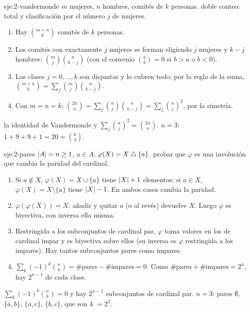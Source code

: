 \begin{solucion}{eje:2-vandermonde}
\datos $m$ mujeres, $n$ hombres, comités de $k$ personas.
\planteamiento doble conteo: total y clasificación por el número $j$ de mujeres.
\pasos
\begin{enumerate}[label=\arabic*.]
  \item Hay $\binom{m+n}{k}$ comités de $k$ personas.
  \item Los comités con exactamente $j$ mujeres se forman eligiendo $j$ mujeres y $k-j$ hombres: $\binom mj\binom n{k-j}$ (con el convenio $\binom ab=0$ si $b>a$ o $b<0$).
  \item Las clases $j=0,\dots,k$ son disjuntas y lo cubren todo; por la regla de la suma, $\binom{m+n}k=\sum_j\binom mj\binom n{k-j}$.
  \item Con $m=n=k$: $\binom{2n}{n}=\sum_j\binom nj\binom n{n-j}=\sum_j\binom nj^{2}$, por la simetría.
\end{enumerate}
\resultado la identidad de Vandermonde y $\sum_j\binom nj^{2}=\binom{2n}n$.
\comprobacion $n=3$: $1+9+9+1=20=\binom63$.
\end{solucion}

\begin{solucion}{eje:2-pares}
\datos $\lvert A\rvert=n\ge1$, $a\in A$; $\varphi(X)=X\mathbin{\triangle}\{a\}$.
\planteamiento probar que $\varphi$ es una involución que cambia la paridad del cardinal.
\pasos
\begin{enumerate}[label=\arabic*.]
  \item Si $a\notin X$, $\varphi(X)=X\cup\{a\}$ tiene $\lvert X\rvert+1$ elementos; si $a\in X$, $\varphi(X)=X\setminus\{a\}$ tiene $\lvert X\rvert-1$. En ambos casos cambia la paridad.
  \item $\varphi(\varphi(X))=X$: añadir y quitar $a$ (o al revés) devuelve $X$. Luego $\varphi$ es biyectiva, con inversa ella misma.
  \item Restringida a los subconjuntos de cardinal par, $\varphi$ toma valores en los de cardinal impar y es biyectiva sobre ellos (su inversa es $\varphi$ restringida a los impares). Hay tantos subconjuntos pares como impares.
  \item $\sum_k(-1)^{k}\binom nk=\#\text{pares}-\#\text{impares}=0$. Como $\#\text{pares}+\#\text{impares}=2^{n}$, hay $2^{n-1}$ de cada clase.
\end{enumerate}
\resultado $\sum_k(-1)^{k}\binom nk=0$ y hay $2^{n-1}$ subconjuntos de cardinal par.
\comprobacion $n=3$: pares $\emptyset$, $\{a,b\}$, $\{a,c\}$, $\{b,c\}$, que son 4 $=2^{2}$.
\end{solucion}

